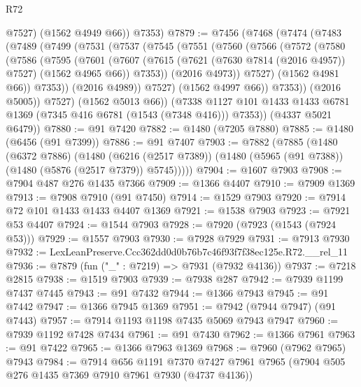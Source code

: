 \begin{lexlean}{R72}
\begin{coremodule}
          @7527)
        (@1562 @4949 @66))
      @7353)
@7879 := @7456
    (@7468
      (@7474
        (@7483
          (@7489
            (@7499
              (@7531
                (@7537
                  (@7545
                    (@7551
                      (@7560
                        (@7566
                          (@7572
                            (@7580
                              (@7586
                                (@7595
                                  (@7601
                                    (@7607
                                      (@7615
                                        (@7621 (@7630 @7814 (@2016 @4957)) @7527)
                                        (@1562 @4965 @66))
                                      @7353))
                                  (@2016 @4973))
                                @7527)
                              (@1562 @4981 @66))
                            @7353))
                        (@2016 @4989))
                      @7527)
                    (@1562 @4997 @66))
                  @7353))
              (@2016 @5005))
            @7527)
          (@1562 @5013 @66))
        (@7338 @1127 @101 @1433 @1433 @6781 @1369 (@7345 @416 @6781 (@1543 (@7348 @416))) @7353))
      (@4337 @5021 @6479))
@7880 := @91 @7420
@7882 := @1480 (@7205 @7880)
@7885 := @1480 (@6456 (@91 @7399))
@7886 := @91 @7407
@7903 := @7882
    (@7885
      (@1480
        (@6372 @7886)
        (@1480
          (@6216 (@2517 @7389))
          (@1480 (@5965 (@91 @7388)) (@1480 (@5876 (@2517 @7379)) @5745)))))
@7904 := @1607 @7903
@7908 := @7904 @487 @276 @1435 @7366
@7909 := @1366 @4407
@7910 := @7909 @1369
@7913 := @7908 @7910 (@91 @7450)
@7914 := @1529 @7903
@7920 := @7914 @72 @101 @1433 @1433 @4407 @1369
@7921 := @1538 @7903
@7923 := @7921 @53 @4407
@7924 := @1544 @7903
@7928 := @7920 (@7923 (@1543 (@7924 @53)))
@7929 := @1557 @7903
@7930 := @7928 @7929
@7931 := @7913 @7930
@7932 := LexLeanPreserve.Ccc362dd0d0b76b7c46f93f7f38ec125e.R72.__rel_11
@7936 := @7879 (fun ("_" : @7219) => @7931 (@7932 @4136))
@7937 := @7218 @2815
@7938 := @1519 @7903
@7939 := @7938 @287
@7942 := @7939 @1199 @7437 @7445
@7943 := @91 @7432
@7944 := @1366 @7943
@7945 := @91 @7442
@7947 := @1366 @7945 @1369
@7951 := @7942 (@7944 @7947) (@91 @7443)
@7957 := @7914 @1193 @1198 @7435 @5069 @7943 @7947
@7960 := @7939 @1192 @7428 @7434
@7961 := @91 @7430
@7962 := @1366 @7961
@7963 := @91 @7422
@7965 := @1366 @7963 @1369
@7968 := @7960 (@7962 @7965) @7943
@7984 := @7914
    @656
    @1191
    @7370
    @7427
    @7961
    @7965
    (@7904 @505 @276 @1435 @7369 @7910 @7961 @7930 (@4737 @4136))

\end{coremodule}
\end{lexlean}
